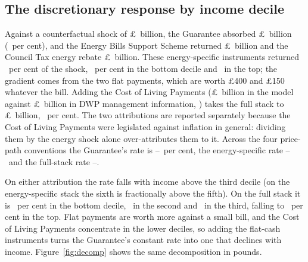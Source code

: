 \subsection{The discretionary response by income decile}

Against a counterfactual shock of \pounds\SsCounterAggBn\ billion, the
Guarantee absorbed \pounds\SsEpgBn\ billion (\SsEpgRatePct\ per cent),
and the Energy Bills Support Scheme returned \pounds\SsEbssBn\ billion
and the Council Tax energy rebate \pounds\SsCtrBn\ billion. These
energy-specific instruments returned \SsEnergySpecificRatePct\ per
cent of the shock, \SsGridPaperEbssDOne\ per cent in the bottom decile
and \SsGridPaperEbssDTen\ in the top; the gradient comes from the two
flat payments, which are worth \pounds 400 and \pounds 150 whatever
the bill. Adding the Cost of Living
Payments (\pounds\SsColBn\ billion in the model against
\pounds\SsColOutturnTotalBn\ billion in DWP management information,
\citealp{dwpcol}) takes the full stack to
\pounds\SsDiscretionaryBn\ billion, \SsDiscretionaryRatePct\ per cent.
The two attributions are reported separately because the Cost of
Living Payments were legislated against inflation in general:
dividing them by the energy shock alone over-attributes them to it.
Across the four price-path conventions the Guarantee's rate is
\SsEpgRateMinPct--\SsEpgRateMaxPct\ per cent, the energy-specific rate
\SsEnergySpecificRateMinPct--\SsEnergySpecificRateMaxPct\ and the
full-stack rate \SsFullRateMinPct--\SsFullRateMaxPct.

On either attribution the rate falls with income above the third
decile (on the energy-specific stack the sixth is fractionally above
the fifth). On the full stack it is \SsGridPaperFullDOne\ per cent in
the bottom decile, \SsCushionPctOneDpDecTwo\ in the second and
\SsGridPaperFullMaxDecilePct\ in the third, falling to
\SsSeasCwActualFullDTen\ per cent in the top. Flat payments are worth
more against a small bill, and the Cost of Living Payments concentrate
in the lower deciles, so adding the flat-cash instruments turns the
Guarantee's constant rate into one that declines with income.
Figure~\ref{fig:decomp} shows the same decomposition in pounds.

